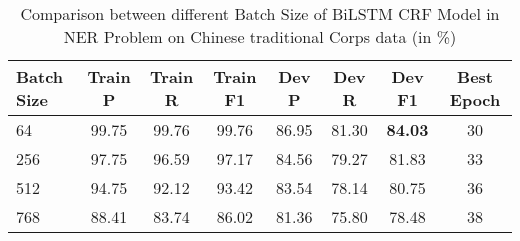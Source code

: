 \begin{table*}[htbp!]
    \centering
    \begin{tabular}{lccccccc}
    \midrule
    Batch Size  &  Train P          & Train R        & Train F1       & Dev P      & Dev R & Dev F1 &Best Epoch\\
    \midrule
    64         & 99.75   & 99.76   & 99.76    & 86.95 & 81.30 & \bf84.03  & 30         \\
    256        & 97.75   & 96.59   & 97.17    & 84.56 & 79.27 & 81.83     & 33         \\
    512        & 94.75   & 92.12   & 93.42    & 83.54 & 78.14 & 80.75     & 36         \\
    768        & 88.41   & 83.74   & 86.02    & 81.36 & 75.80 & 78.48     & 38         \\

    \bottomrule
    \end{tabular}
\caption{Comparison between different Batch Size of BiLSTM CRF Model in NER Problem on Chinese traditional Corps data (in \%)}
\label{tab:batchSize2}
\end{table*}
